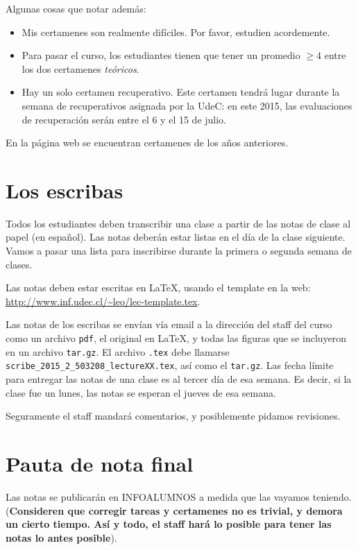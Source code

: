 \documentclass[11pt]{article}
\begin{document}
Algunas cosas que notar adem\'as:

\begin{itemize}
\item Mis certamenes son realmente dif\'iciles. Por favor, estudien
  acordemente.
\item Para pasar el curso, los estudiantes tienen que tener un
  promedio $\geq 4$ entre los dos certamenes {\em te\'oricos}.
\item Hay un solo certamen recuperativo. Este certamen tendr\'a lugar
  durante la semana de recuperativos asignada por la UdeC: en este
  2015, las evaluaciones de recuperaci\'on ser\'an entre el 6 y el 15 de
  julio.
\end{itemize}

En la p\'agina web se encuentran certamenes de los a\~nos anteriores.

\section{Los escribas}
\label{sec:scribes}

Todos los estudiantes deben transcribir una clase a partir de las
notas de clase al papel (en espa\~nol). Las notas deber\'an estar listas
en el d\'ia de la clase siguiente. Vamos a pasar una lista para
inscribirse durante la primera o segunda semana de clases.

Las notas deben estar escritas en \LaTeX, usando el template en la
web: \url{http://www.inf.udec.cl/~leo/lec-template.tex}.

Las notas de los escribas se env\'ian v\'ia email a la direcci\'on del
staff del curso como un archivo \verb+pdf+, el original en \LaTeX, y
todas las figuras que se incluyeron en un archivo \verb+tar.gz+. El
archivo \verb+.tex+ debe llamarse
\verb+scribe_2015_2_503208_lectureXX.tex+, as\'i como el
\verb+tar.gz+. Las fecha l\'imite para entregar las notas de una clase
es al tercer d\'ia de esa semana. Es decir, si la clase fue un lunes,
las notas se esperan el jueves de esa semana.

Seguramente el staff mandar\'a comentarios, y posiblemente pidamos
revisiones.

\section{Pauta de nota final}
\label{sec:notas}

Las notas se publicar\'an en INFOALUMNOS a medida que las vayamos
teniendo. ({\bf Consideren que corregir tareas y certamenes no es
  trivial, y demora un cierto tiempo. As\'i y todo, el staff har\'a lo
  posible para tener las notas lo antes posible}).
\end{document}
